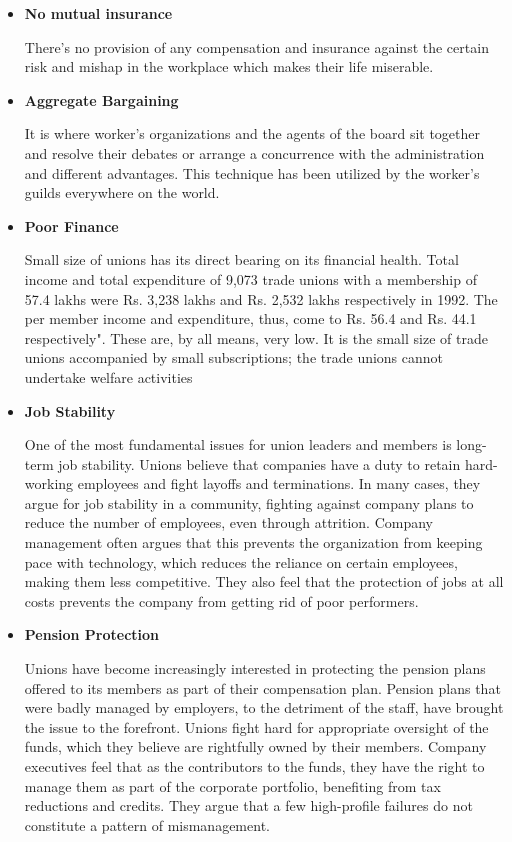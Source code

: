\begin{itemize}

	\item \textbf{No mutual insurance}

There's no provision of any compensation and insurance against the
certain risk and mishap in the workplace which makes their life
miserable.

\item \textbf{Aggregate Bargaining}

It is where worker's organizations and the agents of the board sit
together and resolve their debates or arrange a concurrence with the
administration and different advantages. This technique has been
utilized by the worker's guilds everywhere on the world.

\item  \textbf{Poor Finance}

Small size of unions has its direct bearing on its financial health.
Total income and total expenditure of 9,073 trade unions with a
membership of 57.4 lakhs were Rs. 3,238 lakhs and Rs. 2,532 lakhs
respectively in 1992. The per member income and expenditure, thus, come
to Rs. 56.4 and Rs. 44.1 respectively". These are, by all means, very
low. It is the small size of trade unions accompanied by small
subscriptions; the trade unions cannot undertake welfare activities

\item \textbf{Job Stability}

One of the most fundamental issues for union leaders and members is long-term job stability. Unions believe that companies have a duty to retain hard-working employees and fight layoffs and terminations. In many cases, they argue for job stability in a community, fighting against company plans to reduce the number of employees, even through attrition. Company management often argues that this prevents the organization from keeping pace with technology, which reduces the reliance on certain employees, making them less competitive. They also feel that the protection of jobs at all costs prevents the company from getting rid of poor performers.

\item \textbf{Pension Protection}

Unions have become increasingly interested in protecting the pension plans offered to its members as part of their compensation plan. Pension plans that were badly managed by employers, to the detriment of the staff, have brought the issue to the forefront. Unions fight hard for appropriate oversight of the funds, which they believe are rightfully owned by their members. Company executives feel that as the contributors to the funds, they have the right to manage them as part of the corporate portfolio, benefiting from tax reductions and credits. They argue that a few high-profile failures do not constitute a pattern of mismanagement.


\end{itemize}
